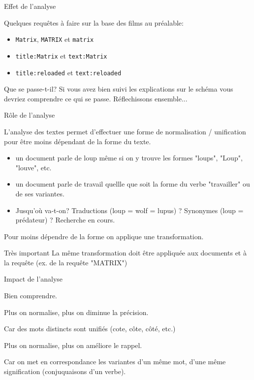
\begin{frame}{Effet de l'analyse}

Quelques requêtes à faire sur la base des films au préalable:

\begin{itemize}
  \item \texttt{Matrix}, \texttt{MATRIX} et \texttt{matrix}
  \item \texttt{title:Matrix} et \texttt{text:Matrix}
  \item \texttt{title:reloaded} et \texttt{text:reloaded}
\end{itemize}

\vfill

\begin{block}{Que se passe-t-il?}
Si vous avez bien suivi les explications sur le schéma vous devriez
comprendre ce qui se passe. Réflechissons ensemble...
\end{block}
\end{frame}

\begin{frame}{Rôle de l'analyse}

L'analyse des textes permet d'effectuer une forme de 
normalisation / unification pour être moins dépendant de la
forme du texte.

\begin{itemize}
  \item un document parle de loup même si on y trouve les formes
     "loups", "Loup", "louve", etc.
  \item un document parle de travail quellle que soit la forme
     du verbe "travailler" ou de ses variantes.
  \item Jusqu'où va-t-on? Traductions (loup = wolf = lupus) ? Synonymes
      (loup  = prédateur) ? Recherche en cours.
\end{itemize}

\vfill

Pour moins dépendre de la forme on applique une \alert{transformation}.
\vfill

\begin{block}{Très important}
La même transformation doit être appliquée aux documents \alert{et} à la
requête (ex. de la requête "MATRIX")
\end{block}
\end{frame}



\begin{frame}{Impact de l'analyse}

Bien comprendre.

\vfill

\alert{Plus on normalise, plus on diminue la précision}.

Car des mots distincts sont unifiés (cote, côte, côté, etc.)
\vfill


\alert{Plus on normalise, plus on améliore le rappel}.

\vfill

Car on met en correspondance les variantes d'un même mot, d'une même
signification (conjuquaisons d'un verbe).

\end{frame}

